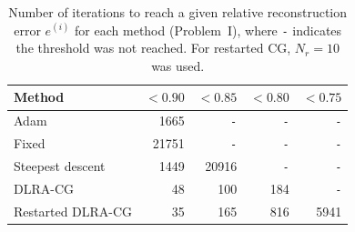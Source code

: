 \begin{table}[!ht]
\centering
\begin{tabular}{lrrrr}
\hline
Method & $< 0.90$ & $< 0.85$ & $< 0.80$ & $< 0.75$ \\
\hline
Adam                   & 1665 & \texttt{-} & \texttt{-} & \texttt{-} \\
Fixed                  & 21751 & \texttt{-} & \texttt{-} & \texttt{-} \\
Steepest descent       & 1449 & 20916 & \texttt{-} & \texttt{-} \\
DLRA-CG                & 48 & 100 & 184 & \texttt{-} \\
Restarted DLRA-CG      & 35 & 165 & 816 & 5941 \\
\hline
\end{tabular}
\caption{Number of iterations to reach a given relative reconstruction error $e^{(i)}$ for each method (Problem~I), where \texttt{-} indicates the threshold was not reached. For restarted CG, $N_r = 10$ was used.}
\label{tab:convergence_iterations}
\end{table}
